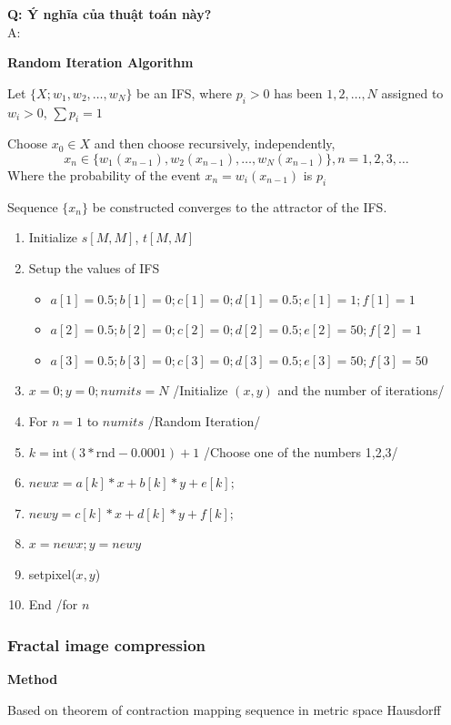 \textbf{Q: Ý nghĩa của thuật toán này?}\\
A: 


\textbf{Random Iteration Algorithm}

Let $\{X; w_1, w_2, \ldots, w_N\}$ be an IFS, where $p_i > 0$ has been $1, 2, \ldots, N$ assigned to $w_i > 0$, $\sum p_i = 1$

Choose $x_0 \in X$ and then choose recursively, independently,
\begin{equation*}
    x_n \in \{ w_1(x_{n-1}), w_2(x_{n-1}), \ldots, w_N(x_{n-1}) \}, n = 1, 2, 3, \ldots
\end{equation*}
Where the probability of the event $x_n = w_i(x_{n-1})$ is $p_i$

Sequence $\{x_n\}$ be constructed converges to the attractor of the IFS.
\begin{enumerate}
    \item Initialize $s[M,M]$, $t[M,M]$
    \item Setup the values of IFS
    \begin{itemize}
        \item $a[1]=0.5; b[1]=0; c[1]=0; d[1]=0.5; e[1]=1; f[1]=1$
        \item $a[2]=0.5; b[2]=0; c[2]=0; d[2]=0.5; e[2]=50; f[2]=1$
        \item $a[3]=0.5; b[3]=0; c[3]=0; d[3]=0.5; e[3]=50; f[3]=50$
    \end{itemize}
    \item $x=0; y=0; numits=N$ /Initialize $(x,y)$ and the number of iterations/
    \item For $n=1$ to $numits$ \quad /Random Iteration/
    \item \quad $k=\text{int}(3*\text{rnd}-0.0001)+1$ /Choose one of the numbers 1,2,3/
    \item \quad $newx=a[k]*x+b[k]*y+e[k];$
    \item \quad $newy=c[k]*x+d[k]*y+f[k];$
    \item \quad $x=newx; y=newy$
    \item \quad setpixel($x,y$)
    \item End /for $n$
\end{enumerate}

\subsubsection {Fractal image compression}
\textbf{Method}

Based on theorem of contraction mapping sequence in metric space Hausdorff

